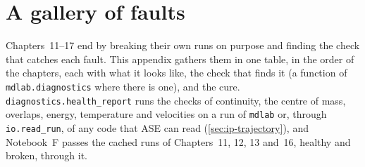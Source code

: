 \chapter{A gallery of faults}
\label{app:gallery}

Chapters~11--17 end by breaking their own runs on purpose
and finding the check that catches each fault. This appendix gathers them
in one table, in the order of the chapters, each with what it looks like,
the check that finds it (a function of \texttt{mdlab.diagnostics} where
there is one), and the cure. \texttt{diagnostics.health\_report} runs the
checks of continuity, the centre of mass, overlaps, energy, temperature
and velocities on a run of \texttt{mdlab} or, through
\texttt{io.read\_run}, of any code that ASE can read
(\cref{sec:ip-trajectory}), and Notebook~F passes the cached runs of
Chapters~11, 12, 13 and~16, healthy and broken, through it.

